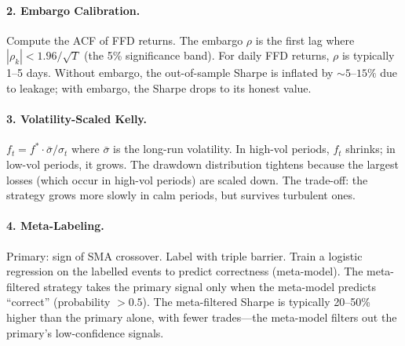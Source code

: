 \paragraph{2. Embargo Calibration.}
Compute the ACF of FFD returns. The embargo $\rho$ is the first lag
where $|\rho_k| < 1.96 / \sqrt{T}$ (the 5\% significance band). For
daily FFD returns, $\rho$ is typically 1--5 days. Without embargo,
the out-of-sample Sharpe is inflated by $\sim 5$--$15\%$ due to
leakage; with embargo, the Sharpe drops to its honest value.

\paragraph{3. Volatility-Scaled Kelly.}
$f_t = f^* \cdot \bar{\sigma} / \sigma_t$ where $\bar{\sigma}$ is
the long-run volatility. In high-vol periods, $f_t$ shrinks; in
low-vol periods, it grows. The drawdown distribution tightens
because the largest losses (which occur in high-vol periods) are
scaled down. The trade-off: the strategy grows more slowly in calm
periods, but survives turbulent ones.

\paragraph{4. Meta-Labeling.}
Primary: sign of SMA crossover. Label with triple barrier. Train a
logistic regression on the labelled events to predict correctness
(meta-model). The meta-filtered strategy takes the primary signal
only when the meta-model predicts ``correct'' (probability $> 0.5$).
The meta-filtered Sharpe is typically 20--50\% higher than the
primary alone, with fewer trades---the meta-model filters out the
primary's low-confidence signals.